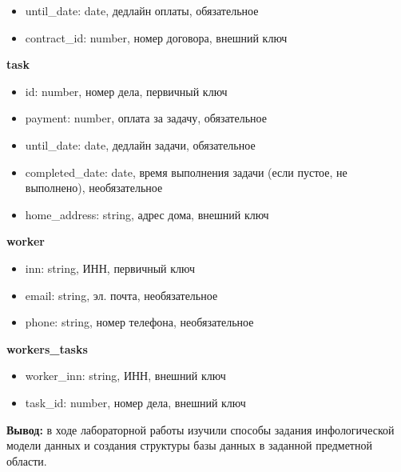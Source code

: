 \documentclass[a4paper,14pt]{extarticle}
\begin{document}
\begin{enumerate}[1.]
\begin{itemize}
        \item until\_date: date, дедлайн оплаты, обязательное
        \item contract\_id: number, номер договора, внешний ключ
    \end{itemize}
    \textbf{task}
    \begin{itemize}
        \item id: number, номер дела, первичный ключ
        \item payment: number, оплата за задачу, обязательное
        \item until\_date: date, дедлайн задачи, обязательное
        \item completed\_date: date, время выполнения задачи 
        (если пустое, не выполнено), необязательное
        \item home\_address: string, адрес дома, внешний ключ
    \end{itemize}
    \textbf{worker}
    \begin{itemize}
        \item inn: string, ИНН, первичный ключ
        \item email: string, эл. почта, необязательное
        \item phone: string, номер телефона, необязательное
    \end{itemize}
    \textbf{workers\_tasks}
    \begin{itemize}
        \item worker\_inn: string, ИНН, внешний ключ
        \item task\_id: number, номер дела, внешний ключ
    \end{itemize}
\end{enumerate}

\textbf{Вывод: } в ходе лабораторной работы изучили способы задания инфологической модели данных и создания структуры базы данных в заданной предметной области.
\end{document}
